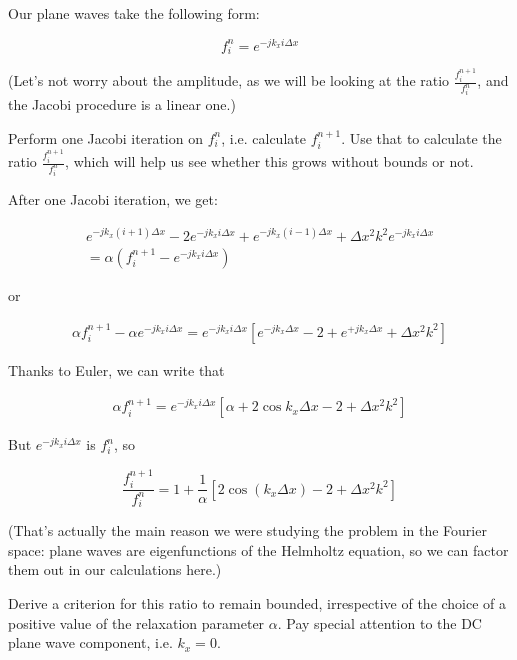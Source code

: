 Our plane waves take the following form:

\begin{equation}
f_i^n = e^{-j k_x i \Delta x}
\end{equation} 

(Let's not worry about the amplitude, as we will be looking at the ratio $\frac{f_i^{n+1}}{f_i^{n}}$, and the Jacobi procedure is a linear one.)

\begin{cue}
Perform one Jacobi iteration on $f_i^n$, i.e. calculate $f_i^{n+1}$. Use that to calculate the ratio $\frac{f_i^{n+1}}{f_i^{n}}$, which will help us see whether this grows without bounds or not.  
\end{cue}

After one Jacobi iteration, we get:

\begin{align}
 e^{-j k_x (i+1) \Delta x} -2 e^{-j k_x i \Delta x} + 
  e^{-j k_x (i-1) \Delta x} + \Delta x^2 k^2  e^{-j k_x i \Delta x} \\ \nonumber
 = \alpha\left(f_i^{n+1} - e^{-j k_x i \Delta x} \right)
\end{align} 

or

\begin{align}
\alpha f_i^{n+1} -  \alpha e^{-j k_x i \Delta x} = e^{-j k_x i \Delta x}  \left[ e^{-j k_x \Delta x} -2 + e^{+j k_x \Delta x} + \Delta x^2 k^2 \right]
\end{align} 

Thanks to Euler, we can write that

\begin{align}
  \alpha f_i^{n+1}  =  e^{-j k_x i \Delta x}  \left[ \alpha +2 \cos {k_x \Delta x} -2 + \Delta x^2 k^2 \right]
\end{align} 

But $ e^{-j k_x i \Delta x}$ is $f_i^n$, so

\begin{equation}
\frac{f_i^{n+1}}{f_i^{n}} =  1 + \frac{1}{\alpha}\left[2 \cos ( k_x  \Delta x) - 2 + \Delta x^2 k^2\right]
\label{eq-jacobi-conv}
\end{equation} 

(That's actually the main reason we were studying the problem in the Fourier space: plane waves are eigenfunctions of the Helmholtz equation, so we can factor them out in our calculations here.)

\begin{cue}
Derive a criterion for this ratio to remain bounded, irrespective of the choice of a positive value of the relaxation parameter $\alpha$. Pay special attention to the DC plane wave component, i.e. $k_x=0$. 
\end{cue}

